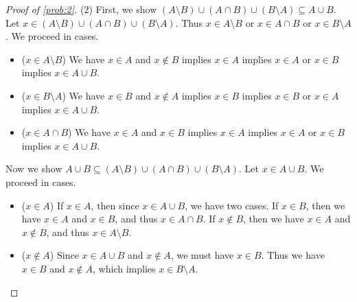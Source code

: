 \documentclass[11pt, letterpaper]{article}
\begin{document}
\begin{proof}[Proof of \cref{prob:2}]
	(2) First, we show $(A\setminus B)\cup (A \cap B) \cup (B\setminus A) \subseteq A \cup B$. Let $x\in (A\setminus B) \cup (A \cap B) \cup (B\setminus A)$. Thus $x\in A\setminus B$ or $x\in A \cap B$ or $x\in B\setminus A$. We proceed in cases.
	\begin{itemize}
		\item ($x\in A\setminus B$) We have $x\in A$ and $x\notin B$ implies $x\in A$ implies $x\in A$ or $x\in B$ implies $x\in A \cup B$.
		\item ($x\in B\setminus A$) We have $x\in B$ and $x\notin A$ implies $x\in B$ implies $x\in B$ or $x\in A$ implies $x\in A \cup B$.
		\item ($x\in A \cap B$) We have $x\in A$ and $x\in B$ implies $x\in A$ implies $x\in A$ or $x\in B$ implies $x\in A \cup B$.
	\end{itemize}
	Now we show $A \cup B \subseteq (A \setminus B)\cup (A \cap B)\cup (B\setminus A)$. Let $x\in A \cup B$. We proceed in cases.
	\begin{itemize}
		\item ($x\in A$) If $x\in A$, then since $x\in A \cup B$, we have two cases. If $x\in B$, then we have $x\in A$ and $x\in B$, and thus $x\in A \cap B$. If $x\notin B$, then we have $x\in A$ and $x\notin B$, and thus $x\in A\setminus B$.
		\item ($x\notin A$) Since $x\in A \cup B$ and $x\notin A$, we must have $x\in B$. Thus we have $x\in B$ and $x\notin A$, which implies $x\in B\setminus A$.
	\end{itemize}
	
\end{proof}
\end{document}
